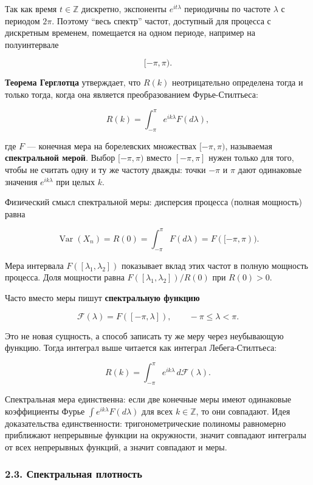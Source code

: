 \documentclass[
  11pt,
  a4paper,
]{article}
\begin{document}
Так как время \(t \in \mathbb{Z}\) дискретно, экспоненты
\(e^{i t \lambda}\) периодичны по частоте \(\lambda\) с периодом
\(2\pi\). Поэтому ``весь спектр'' частот, доступный для процесса с
дискретным временем, помещается на одном периоде, например на
полуинтервале

\[
[-\pi, \pi).
\]

\textbf{Теорема Герглотца} утверждает, что \(R(k)\) неотрицательно
определена тогда и только тогда, когда она является преобразованием
Фурье-Стилтьеса:

\[
R(k) = \int_{-\pi}^{\pi} e^{i k \lambda} F(d\lambda),
\]

где \(F\) --- конечная мера на борелевских множествах \([-\pi, \pi)\),
называемая \textbf{спектральной мерой}. Выбор \([-\pi,\pi)\) вместо
\([-\pi,\pi]\) нужен только для того, чтобы не считать одну и ту же
частоту дважды: точки \(-\pi\) и \(\pi\) дают одинаковые значения
\(e^{ik\lambda}\) при целых \(k\).

Физический смысл спектральной меры: дисперсия процесса (полная мощность)
равна

\[
\operatorname{Var}(X_n) = R(0) = \int_{-\pi}^{\pi} F(d\lambda) = F([-\pi, \pi)).
\]

Мера интервала \(F([\lambda_1, \lambda_2])\) показывает вклад этих
частот в полную мощность процесса. Доля мощности равна
\(F([\lambda_1,\lambda_2])/R(0)\) при \(R(0)>0\).

Часто вместо меры пишут \textbf{спектральную функцию}

\[
\mathcal F(\lambda)=F([-\pi,\lambda]), \qquad -\pi\le \lambda<\pi.
\]

Это не новая сущность, а способ записать ту же меру через неубывающую
функцию. Тогда интеграл выше читается как интеграл Лебега-Стилтьеса:

\[
R(k)=\int_{-\pi}^{\pi}e^{ik\lambda}\,d\mathcal F(\lambda).
\]

Спектральная мера единственна: если две конечные меры имеют одинаковые
коэффициенты Фурье \(\int e^{ik\lambda}F(d\lambda)\) для всех
\(k\in\mathbb Z\), то они совпадают. Идея доказательства единственности:
тригонометрические полиномы равномерно приближают непрерывные функции на
окружности, значит совпадают интегралы от всех непрерывных функций, а
значит совпадают и меры.

\subsubsection{2.3. Спектральная
плотность}\label{ux441ux43fux435ux43aux442ux440ux430ux43bux44cux43dux430ux44f-ux43fux43bux43eux442ux43dux43eux441ux442ux44c}
\end{document}
